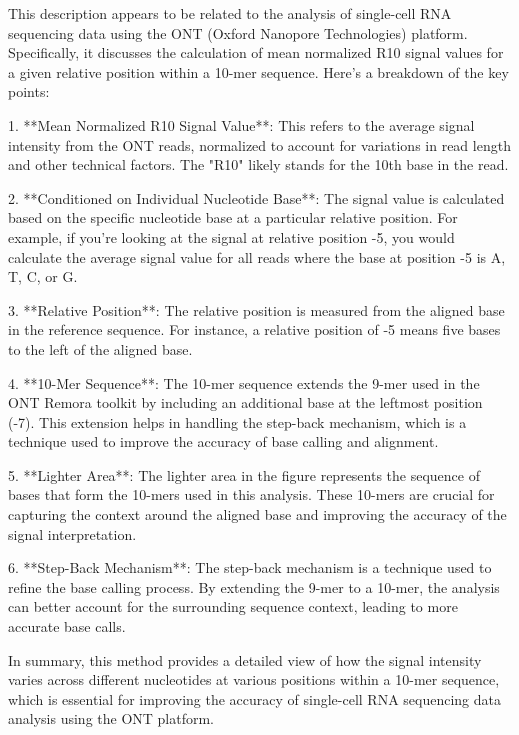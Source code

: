 This description appears to be related to the analysis of single-cell RNA sequencing data using the ONT (Oxford Nanopore Technologies) platform. Specifically, it discusses the calculation of mean normalized R10 signal values for a given relative position within a 10-mer sequence. Here's a breakdown of the key points:

1. **Mean Normalized R10 Signal Value**: This refers to the average signal intensity from the ONT reads, normalized to account for variations in read length and other technical factors. The "R10" likely stands for the 10th base in the read.

2. **Conditioned on Individual Nucleotide Base**: The signal value is calculated based on the specific nucleotide base at a particular relative position. For example, if you're looking at the signal at relative position -5, you would calculate the average signal value for all reads where the base at position -5 is A, T, C, or G.

3. **Relative Position**: The relative position is measured from the aligned base in the reference sequence. For instance, a relative position of -5 means five bases to the left of the aligned base.

4. **10-Mer Sequence**: The 10-mer sequence extends the 9-mer used in the ONT Remora toolkit by including an additional base at the leftmost position (-7). This extension helps in handling the step-back mechanism, which is a technique used to improve the accuracy of base calling and alignment.

5. **Lighter Area**: The lighter area in the figure represents the sequence of bases that form the 10-mers used in this analysis. These 10-mers are crucial for capturing the context around the aligned base and improving the accuracy of the signal interpretation.

6. **Step-Back Mechanism**: The step-back mechanism is a technique used to refine the base calling process. By extending the 9-mer to a 10-mer, the analysis can better account for the surrounding sequence context, leading to more accurate base calls.

In summary, this method provides a detailed view of how the signal intensity varies across different nucleotides at various positions within a 10-mer sequence, which is essential for improving the accuracy of single-cell RNA sequencing data analysis using the ONT platform.